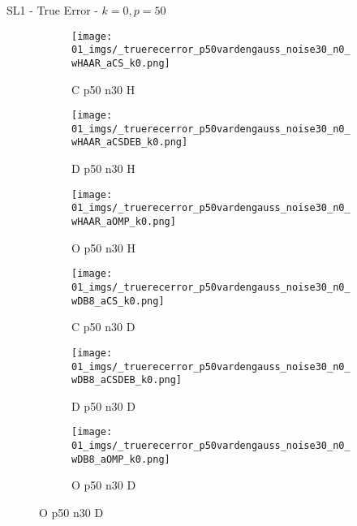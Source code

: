 \begin{frame}{SL1 - True Error - $k=0,p=50$}{}
\begin{figure}
\vspace{5pt}

\begin{subfigure}{0.13\textwidth}
\texttt{[image: 01\_imgs/\_truerecerror\_p50vardengauss\_noise30\_n0\_wHAAR\_aCS\_k0.png]}
\caption*{\tiny C p50 n30 H}
\end{subfigure}
\begin{subfigure}{0.13\textwidth}
\texttt{[image: 01\_imgs/\_truerecerror\_p50vardengauss\_noise30\_n0\_wHAAR\_aCSDEB\_k0.png]}
\caption*{\tiny D p50 n30 H}
\end{subfigure}
\begin{subfigure}{0.13\textwidth}
\texttt{[image: 01\_imgs/\_truerecerror\_p50vardengauss\_noise30\_n0\_wHAAR\_aOMP\_k0.png]}
\caption*{\tiny O p50 n30 H}
\end{subfigure}
\begin{subfigure}{0.13\textwidth}
\texttt{[image: 01\_imgs/\_truerecerror\_p50vardengauss\_noise30\_n0\_wDB8\_aCS\_k0.png]}
\caption*{\tiny C p50 n30 D}
\end{subfigure}
\begin{subfigure}{0.13\textwidth}
\texttt{[image: 01\_imgs/\_truerecerror\_p50vardengauss\_noise30\_n0\_wDB8\_aCSDEB\_k0.png]}
\caption*{\tiny D p50 n30 D}
\end{subfigure}
\begin{subfigure}{0.13\textwidth}
\texttt{[image: 01\_imgs/\_truerecerror\_p50vardengauss\_noise30\_n0\_wDB8\_aOMP\_k0.png]}
\caption*{\tiny O p50 n30 D}
\end{subfigure}
\end{figure}
\end{frame}


